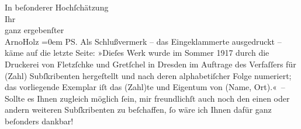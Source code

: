 \begin{ledgroupsized}[t]{13cm}
           \pstart
           In beſonderer Hochſchätzung{\\[\baselineskip]}Ihr{\\[\baselineskip]}ganz ergebenſter{\\[\baselineskip]}\spacefill\mbox{ArnoHolz}\pend
           \leftskip=0em{}\pstart
           PS. Als Schlußvermerk – das Eingeklammerte ausgedruckt – käme auf die letzte
                    Seite:\pend
           \pstart
           »Dieſes Werk wurde im Sommer 1917 durch die Druckerei von Fletzſchke und Gretſchel in Dresden im Auftrage des Verfaſſers für (Zahl)
                    Subſkribenten hergeſtellt und nach deren alphabetiſcher Folge numeriert; das
                    vorliegende Exemplar iſt das (Zahl)te und Eigentum von (Name, Ort).« –\pend
           \pstart
           Sollte es Ihnen zugleich möglich ſein, mir freundlichſt auch noch den einen oder
                    andern weiteren Subſkribenten zu beſchaffen, ſo wäre ich Ihnen dafür ganz
                    beſonders dankbar!\pend
                     \endnumbering{}\end{ledgroupsized}  \newcommand{\dateiname}{L02255}\newcommand{\titel}{Arno Holz an Arthur Schnitzler, 11. 2. 1917}\newcommand{\editorInnen}{Martin Anton Müller und Gerd-Hermann Susen}
      